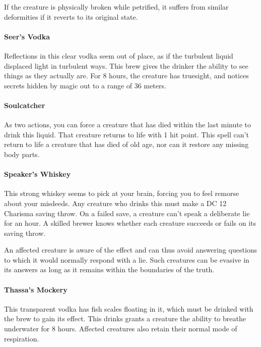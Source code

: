     If the creature is physically broken while petrified, it suffers from similar deformities if it reverts to its original state.
\paragraph{Seer's Vodka} %
    Reflections in this clear vodka seem out of place, as if the turbulent liquid displaced light in turbulent ways.
    This brew gives the drinker the ability to see things as they actually are.
    For 8 hours, the creature has truesight, and notices secrets hidden by magic out to a range of 36 meters.
\paragraph{Soulcatcher} %
    As two actions, you can force a creature that has died within the last minute to drink this liquid.
    That creature returns to life with 1 hit point.
    This spell can't return to life a creature that has died of old age, nor can it restore any missing body parts.
\paragraph{Speaker's Whiskey} %
    This strong whiskey seems to pick at your brain, forcing you to feel remorse about your misdeeds.
    Any creature who drinks this must make a DC 12 Charisma saving throw.
    On a failed save, a creature can't speak a deliberate lie for an hour.
    A skilled brewer knows whether each creature succeeds or fails on its saving throw.

    An affected creature is aware of the effect and can thus avoid answering questions to which it would normally respond with a lie.
    Such creatures can be evasive in its answers as long as it remains within the boundaries of the truth.
\paragraph{Thassa's Mockery} %
    This transparent vodka has fish scales floating in it, which must be drinked with the brew to gain its effect.
    This drinks grants a creature the ability to breathe underwater for 8 hours.
    Affected creatures also retain their normal mode of respiration.

